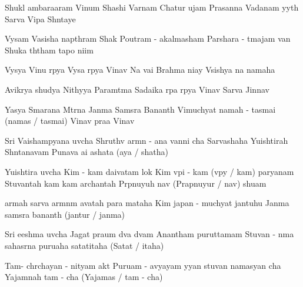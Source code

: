\documentclass[20pt]{article}
\begin{document}

\SlokaHuge
{Shukl{\A} ambara{\dhh}aram Vi{\sh}num} {Shashi Varnam Chatur {\Bh}ujam}
{Prasanna Vadanam {\Dh}y{\A}y{\e}th} {Sarva Vipa Sh{\A}ntaye}

\phantom{\countr}
\SlokaHuge
{Vy{\A}sam Vasish{\T}a napth{\A}ram} {Shak{\teh} Poutram - akalmasham}
{Par{\A}shara - {\A}tmajam van{\de}} {Shuka th{\A}tham tapo ni{\dhh}im}

\SlokaHuge
{Vy{\A}s{\A}ya Vi{\sh}nu r{\oo}p{\A}ya} {Vy{\A}sa r{\oo}p{\A}ya Vi{\sh}nav{\e}}
{Na{\mo} vai Brahma ni{\dhh}ay{\e}} {V{\aaa}sishya na{\mo} namaha}

\newpage

\SlokaHuge
{Avik{\A}r{\A}ya shud{\dhh}{\A}ya} {Nithy{\A}ya Param{\A}tma{\nE}}
{Sadaika r{\oo}pa r{\oo}p{\A}ya} {Vi{\sh}nav{\e} Sarva Ji{\sh}nnav{\e}}

\SlokaHuge
{Yasya Smarana M{\A}tr{\e}na} {Janma Sams{\A}ra Ban{\dhh}an{\A}th}
{Vimuchyat{\e} namah - tasmai (namas / tasmai)} {Vi{\sh}nav{\e} pra{\bh}a Vi{\sh}nav{\e}}


\SlokaHeaderHuge
{Sri Vaishamp{\A}yana uv{\A}cha}
{Shruthv{\A} {\Dh}arm{\A}n - a{\she}{\she}na} {{\Pa}van{\A}ni cha Sarvashaha}
{Yu{\dhh}ishtirah Sh{\A}ntanavam} {Puna{\re}va \dsh a{\bh}i \dsh a{\bha}shata (a{\bh}ya / {\bha}shatha)}

\newpage

\SlokaHeaderHuge
{Yu{\dhh}ishtira uv{\A}cha}
{Kim - {\e}kam daivatam lok{\e}} {Kim v{\A}pi - {\e}kam (v{\A}py{\e} / kam) par{\A}yanam}
{Stuvantah kam kam \dsh archantah} {Pr{\A}pnuyuh \dsh {\ma}nav{\ah} (Prapnuyur / {\ma}nav{\ah}) shu{\bh}am}

\SlokaHuge
{{\Ko} {\Dh}armah sarva {\Dh}arm{\A}n{\aaa}m} {{\bh}avatah para{\mo} mataha}
{Kim japan - muchyat{\e} jantuhu} {Janma sams{\A}ra ban{\dhh}an{\A}th (jantur / janma)}

\SlokaHeaderHuge
{Sri {\Bh}eeshma uv{\A}cha}
{Jagat pra{\bh}um d{\e}va d{\e}vam} {Anantham puru{\sh}{\oh}ttamam}
{Stuvan - n{\A}ma sahasr{\e}na} {puru{\sh}aha satat{\oh}{\Th}itaha (Satat{\oh} / {\Th}itaha)}

\newpage

\SlokaHuge
{Tam-{\eva} ch{\aaa}rchayan - nityam} {{\Bh}akt{\ya} Puru{\sh}am - avyayam}
{{\Dh}y{\A}yan stuvan namasyan \dsh cha} {Yajam{\aaa}nah tam - {\eva} cha (Yajam{\an}as / tam - {\eva} cha)}
\end{document}
